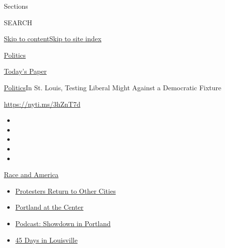 Sections

SEARCH

\protect\hyperlink{site-content}{Skip to
content}\protect\hyperlink{site-index}{Skip to site index}

\href{https://www.nytimes3xbfgragh.onion/section/politics}{Politics}

\href{https://myaccount.nytimes3xbfgragh.onion/auth/login?response_type=cookie\&client_id=vi}{}

\href{https://www.nytimes3xbfgragh.onion/section/todayspaper}{Today's
Paper}

\href{/section/politics}{Politics}\textbar{}In St. Louis, Testing
Liberal Might Against a Democratic Fixture

\url{https://nyti.ms/3hZnT7d}

\begin{itemize}
\item
\item
\item
\item
\item
\end{itemize}

\href{https://www.nytimes3xbfgragh.onion/news-event/george-floyd-protests-minneapolis-new-york-los-angeles?action=click\&pgtype=Article\&state=default\&region=TOP_BANNER\&context=storylines_menu}{Race
and America}

\begin{itemize}
\tightlist
\item
  \href{https://www.nytimes3xbfgragh.onion/2020/07/26/us/protests-portland-seattle-trump.html?action=click\&pgtype=Article\&state=default\&region=TOP_BANNER\&context=storylines_menu}{Protesters
  Return to Other Cities}
\item
  \href{https://www.nytimes3xbfgragh.onion/2020/07/24/us/portland-oregon-protests-white-race.html?action=click\&pgtype=Article\&state=default\&region=TOP_BANNER\&context=storylines_menu}{Portland
  at the Center}
\item
  \href{https://www.nytimes3xbfgragh.onion/2020/07/23/podcasts/the-daily/portland-protests.html?action=click\&pgtype=Article\&state=default\&region=TOP_BANNER\&context=storylines_menu}{Podcast:
  Showdown in Portland}
\item
  \href{https://www.nytimes3xbfgragh.onion/interactive/2020/07/16/us/black-lives-matter-protests-louisville-breonna-taylor.html?action=click\&pgtype=Article\&state=default\&region=TOP_BANNER\&context=storylines_menu}{45
  Days in Louisville}
\end{itemize}


